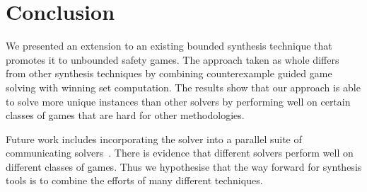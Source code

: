 \documentclass{llncs}
\begin{document}
\section{Conclusion}

We presented an extension to an existing bounded synthesis technique that
promotes it to unbounded safety games. The approach taken as whole differs from
other synthesis techniques by combining counterexample guided game solving with
winning set computation. The results show that our approach is able to solve
more unique instances than other solvers by performing well on certain classes
of games that are hard for other methodologies.

Future work includes incorporating the solver into a parallel suite of
communicating solvers~\cite{bloem2014}. There is evidence that different
solvers perform well on different classes of games. Thus we hypothesise that
the way forward for synthesis tools is to combine the efforts of many different
techniques.



\end{document}
